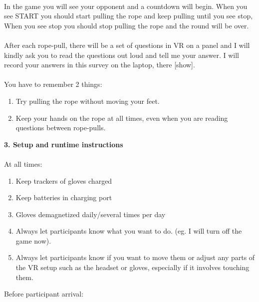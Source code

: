 \\
In the game you will see your opponent and a countdown will begin. When you see START you should start pulling the rope and keep pulling until you see stop, When you see stop you should stop pulling the rope and the round will be over.\\
\\
After each rope-pull, there will be a set of questions in VR on a panel and I will kindly ask you to read the questions out loud and tell me your answer. I will record your answers in this survey on the laptop, there [show].\\
\\
You have to remember 2 things:
\begin{enumerate}
\itemsep0em 
    \item Try pulling the rope without moving your feet.
    \item Keep your hands on the rope at all times, even when you are reading questions between rope-pulls.
\end{enumerate}
\textbf{3. Setup and runtime instructions} \\
\\
At all times:
\begin{enumerate}
\itemsep0em 
    \item Keep trackers of gloves charged
    \item Keep batteries in charging port
    \item Gloves demagnetized daily/several times per day
    \item Always let participants know what you want to do. (eg.  I will turn off the game now). 
    \item Always let participants know if you want to move them or adjust any parts of the VR setup such as the headset or gloves, especially if it involves touching them. 
\end{enumerate}
Before participant arrival:
